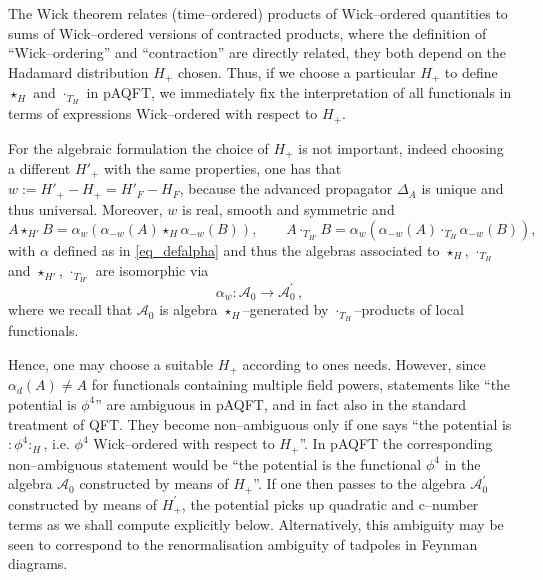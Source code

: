 \documentclass[10pt]{book}
\newcommand{\wick}[1]{:\!{#1}\!:}
\newcommand{\Acal}{\mathcal{A}}
\theoremstyle{break}
\begin{document}
The Wick theorem relates (time--ordered) products of Wick--ordered quantities to sums of Wick--ordered versions of contracted products, where the definition of ``Wick--ordering'' and ``contraction'' are directly related, they both depend on the Hadamard distribution  $H_+$ chosen. Thus, if we choose a particular $H_+$ to define $\star_H$ and $\cdot_{T_H}$ in pAQFT, we immediately fix the interpretation of all functionals in terms of expressions Wick--ordered with respect to $H_+$.

For the algebraic formulation the choice of $H_+$ is not important, indeed choosing a different $H'_+$ with the same properties, one has that $w:=H'_+-H_+=H'_F-H_F$, because the advanced propagator $\Delta_A$ is unique and thus universal. Moreover, $w$ is real, smooth and symmetric and
$$A\star_{H'}B=\alpha_w\left(\alpha_{-w}(A)\star_H\alpha_{-w}(B)\right),\qquad A\cdot_{T_{H'}}B=\alpha_w\left(\alpha_{-w}(A)\cdot_{T_H}\alpha_{-w}(B)\right),$$
with $\alpha$ defined as in \eqref{eq_defalpha} and thus the algebras associated to $\star_H$, $\cdot_{T_H}$ and  $\star_{H'}$, $\cdot_{T_{H'}}$ are isomorphic via $$\alpha_{w}:\Acal_0\to \Acal^\prime_0\,,$$ where we recall that $\Acal_0$ is algebra $\star_H$--generated by $\cdot_{T_H}$--products of local functionals.

Hence, one may choose a suitable $H_+$ according to ones needs. However, since $\alpha_{d}(A)\neq A$ for functionals containing multiple field powers, statements like ``the potential is $\phi^4$'' are ambiguous in pAQFT, and in fact also in the standard treatment of QFT. They become non--ambiguous only if one says ``the potential is $\wick{\phi^4}_H$, i.e.  $\phi^4$ Wick--ordered with respect to $H_+$''. In pAQFT the corresponding non--ambiguous statement would be ``the potential is the functional $\phi^4$ in the algebra $\Acal_0$ constructed by means of $H_+$''. If one then passes to the algebra $\Acal^\prime_0$ constructed by means of $H^\prime_+$, the potential picks up quadratic and c--number terms as we shall compute explicitly below. Alternatively, this ambiguity may be seen to correspond to the renormalisation ambiguity of tadpoles in Feynman diagrams.
\end{document}

